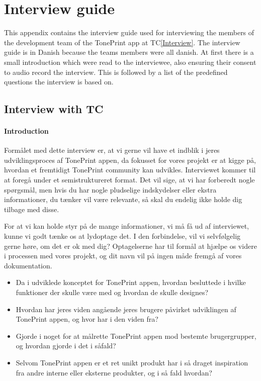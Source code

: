 \chapter{Interview guide}
\label{AppendixInterviewGuide}
%
This appendix contains the interview guide used for interviewing the members of the development team of the TonePrint app at TC\autoref{Interview}. The interview guide is in Danish because the teams members were all danish. At first there is a small introduction which were read to the interviewee, also ensuring their consent to audio record the interview. This is followed by a list of the predefined questions the interview is based on. 
%
\section{Interview with TC}
\label{InterviewInputs}

\subsubsection{Introduction}
Formålet med dette interview er, at vi gerne vil have et indblik i jeres udviklingsproces af TonePrint appen, da fokusset for vores projekt er at kigge på, hvordan et fremtidigt TonePrint community kan udvikles. Interviewet kommer til at foregå under et semistruktureret format. Det vil sige, at vi har forberedt nogle spørgsmål, men hvis du har nogle pludselige indskydelser eller ekstra informationer, du tænker vil være relevante, så skal du endelig ikke holde dig tilbage med disse.

For at vi kan holde styr på de mange informationer, vi må få ud af interviewet, kunne vi godt tænke os at lydoptage det. I den forbindelse, vil vi selvfølgelig gerne høre, om det er ok med dig? Optagelserne har til formål at hjælpe os videre i processen med vores projekt, og dit navn vil på ingen måde fremgå af vores dokumentation.

\begin{itemize}
  \item Da i udviklede konceptet for TonePrint appen, hvordan besluttede i hvilke funktioner der skulle være med og hvordan de skulle designes?\\
  \item Hvordan har jeres viden angående jeres brugere påvirket udviklingen af TonePrint appen, og hvor har i den viden fra?\\
  \item Gjorde i noget for at målrette TonePrint appen mod bestemte brugergrupper, og hvordan gjorde i det i såfald?\\
  \item Selvom TonePrint appen er et ret unikt produkt har i så draget inspiration fra andre interne eller eksterne produkter, og i så fald hvordan?\\
\end{itemize}


